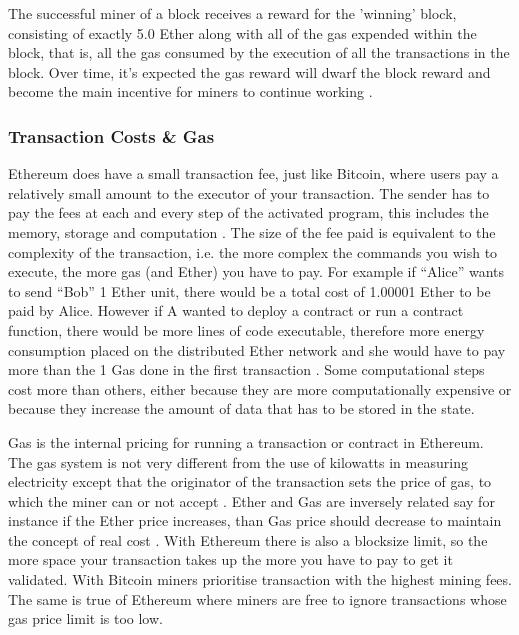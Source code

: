 \documentclass{article}
\begin{document}
The successful miner of a block receives a reward for the 'winning' block, consisting of exactly 5.0 Ether along with all of the gas expended within the block, that is, all the gas consumed by the execution of all the transactions in the block. Over time, it's expected the gas reward will dwarf the block reward and become the main incentive for miners to continue working \citep{57_introduction_ethereum_frontier_guide_2017}.

\subsubsection{Transaction Costs \& Gas}
Ethereum does have a small transaction fee, just like Bitcoin, where users pay a relatively small amount to the executor of your transaction. The sender has to pay the fees at each and every step of the activated program, this includes the memory, storage and computation \citep{54_ethereum_explained_2017}. The size of the fee paid is equivalent to the complexity of the transaction, i.e. the more complex the commands you wish to execute, the more gas (and Ether) you have to pay. For example if ``Alice'' wants to send ``Bob'' 1 Ether unit, there would be a total cost of 1.00001 Ether to be paid by Alice. However if A wanted to deploy a contract or run a contract function, there would be more lines of code executable, therefore more energy consumption placed on the distributed Ether network and she would have to pay more than the 1 Gas done in the first transaction \citep{56_ethereum_2017}. Some computational steps cost more than others, either because they are more computationally expensive or because they increase the amount of data that has to be stored in the state. 

Gas is the internal pricing for running a transaction or contract in Ethereum. The gas system is not very different from the use of kilowatts in measuring electricity except that the originator of the transaction sets the price of gas, to which the miner can or not accept \citep{56_ethereum_2017}. Ether and Gas are inversely related say for instance if the Ether price increases, than Gas price should decrease to maintain the concept of real cost \citep{54_ethereum_explained_2017}. With Ethereum there is also a blocksize limit, so the more space your transaction takes up the more you have to pay to get it validated. With Bitcoin miners prioritise transaction with the highest mining fees. The same is true of Ethereum where miners are free to ignore transactions whose gas price limit is too low. 
\end{document}
